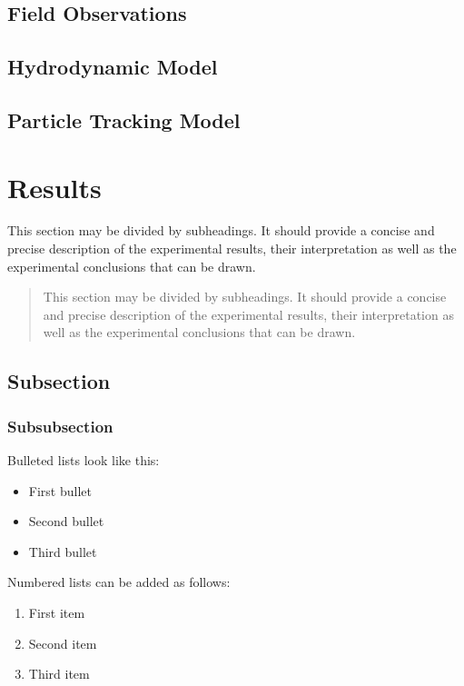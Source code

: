 \documentclass[journal,article,submit,moreauthors,pdftex,water]{Definitions/mdpi}
\begin{document}
\subsection{Field Observations}

\subsection{Hydrodynamic Model}

\subsection{Particle Tracking Model}



\section{Results}

This section may be divided by subheadings. It should provide a concise and precise description of the experimental results, their interpretation as well as the experimental conclusions that can be drawn.
\begin{quote}
This section may be divided by subheadings. It should provide a concise and precise description of the experimental results, their interpretation as well as the experimental conclusions that can be drawn.
\end{quote}

\subsection{Subsection}
\unskip
\subsubsection{Subsubsection}

Bulleted lists look like this:
\begin{itemize}[leftmargin=*,labelsep=5.8mm]
\item	First bullet
\item	Second bullet
\item	Third bullet
\end{itemize}

Numbered lists can be added as follows:
\begin{enumerate}[leftmargin=*,labelsep=4.9mm]
\item	First item 
\item	Second item
\item	Third item
\end{enumerate}
\end{document}
